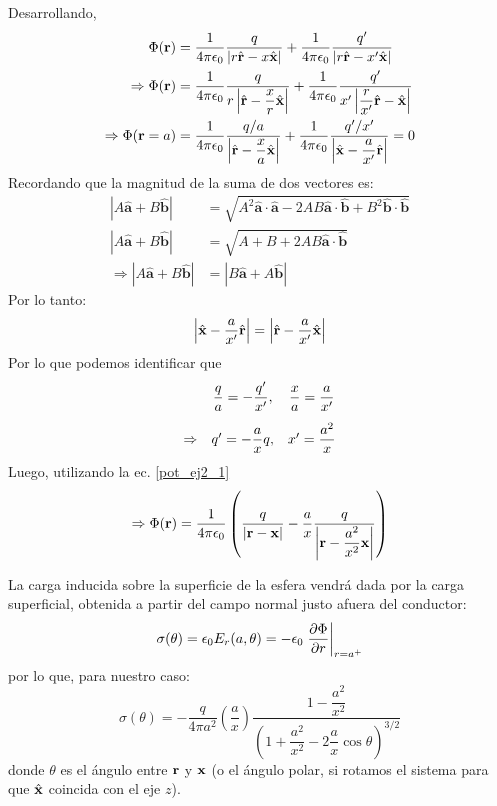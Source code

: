 \documentclass[]{article}
\numberwithin{equation}{section}
\begin{document}
Desarrollando,
\begin{align}
	\Phi(\rv) &= \ke\frac{q}{|r\rhat - x\xhat|} + \ke\frac{q'}{\left|r\rhat - x'\xhat\right|}\label{pot_ej2_1}\\
	\Rightarrow\Phi(\rv) &= \ke\frac{q}{r\left|\rhat - \dfrac{x}{r}\xhat\right|} + \ke\frac{q'}{x'\left|\dfrac{r}{x'}\rhat - \xhat\right|}\nonumber\\
	\Rightarrow\Phi(\rv = a) &= \ke\frac{q/a}{\left|\rhat - \dfrac{x}{a}\xhat\right|} + \ke\frac{q'/x'}{\left|\xhat - \dfrac{a}{x'}\rhat\right|} = 0
\end{align}
Recordando que la magnitud de la suma de dos vectores es:
\begin{align}
	|A\hat{\mathbf{a}} + B\hat{\mathbf{b}}| &= \sqrt{A^2\hat{\mathbf{a}}\cdot\hat{\mathbf{a}} - 2AB\hat{\mathbf{a}}\cdot\hat{\mathbf{b}} + B^2\hat{\mathbf{b}}\cdot\hat{\mathbf{b}}}\nonumber\\
	|A\hat{\mathbf{a}} + B\hat{\mathbf{b}}| &= \sqrt{A + B + 2AB\hat{\mathbf{a}}\cdot\hat{\mathbf{b}}}\nonumber\\
	\Rightarrow |A\hat{\mathbf{a}} + B\hat{\mathbf{b}}| &= |B\hat{\mathbf{a}} + A\hat{\mathbf{b}}|
\end{align}
Por lo tanto:
\begin{equation*}
	\left|\hat{\mathbf{x}} - \dfrac{a}{x'}\hat{\mathbf{r}}\right| = \left|\hat{\mathbf{r}} - \dfrac{a}{x'}\hat{\mathbf{x}}\right|
\end{equation*}
Por lo que podemos identificar que
\begin{equation*}
	\begin{matrix}
		&\dfrac{q}{a} = -\dfrac{q'}{x'}, & \dfrac{x}{a} = \dfrac{a}{x'}	\vspace{3mm}\\
		\Rightarrow& q' = -\dfrac{a}{x}q, & x' = \dfrac{a^2}{x}
	\end{matrix}
\end{equation*}
Luego, utilizando la ec. \ref{pot_ej2_1}
\begin{equation}
	\Rightarrow\Phi(\rv) = \ke\left( \frac{q}{|\rv - \xv|} - \frac{a}{x}\frac{q}{\left|\rv -  \dfrac{a^2}{x^2}\xv\right|}\right) \label{pot_ej2_2}
\end{equation}

La carga inducida sobre la superficie de la esfera vendrá dada por la carga superficial, obtenida a partir del campo normal justo afuera del conductor:
\begin{equation}
	\sigma(\theta) = \epsilon_{0} E_r(a,\theta) = -\epsilon_{0}\left. \frac{\partial\Phi}{\partial r}\right|_{r=a^+}
\end{equation}
por lo que, para nuestro caso:
\begin{equation*}
	\sigma(\theta) = -\frac{q}{4\pi a^2}\left(\frac{a}{x}\right) \frac{1 - \dfrac{a^2}{x^2}}{\left(1 + \dfrac{a^2}{x^2} - 2\dfrac{a}{x}\cos\theta\right)^{3/2}}
\end{equation*}
donde \(\theta\) es el ángulo entre \(\mathbf{r}\) y \(\mathbf{x}\) (o el ángulo polar, si rotamos el sistema para que \(\hat{\mathbf{x}}\) coincida con el eje \(z\)).
\end{document}
